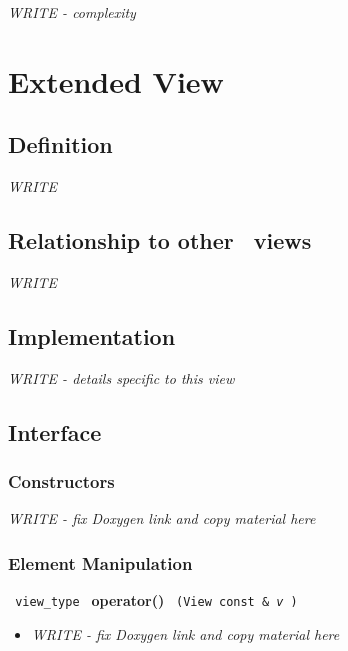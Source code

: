 \emph{WRITE - complexity}


\section{Extended View} \label{sec-extend-vw}

\subsection{Definition}

\textit{WRITE}

\subsection{Relationship to other \stapl\ views}

\textit{WRITE}

\subsection{Implementation}

\textit{WRITE - details specific to this view}

\subsection{Interface} \label{sec-ext-vw-inter}

\subsubsection{Constructors}

\textit{WRITE - fix Doxygen link and copy material here}

\subsubsection{ Element Manipulation}

\noindent
\texttt{%
view\_type
}
\newline
\textbf{operator()}%
\texttt{%
(View const \&
\textit{v}%
)
}

\begin{itemize}
\item
\textit{WRITE - fix Doxygen link and copy material here}
\end{itemize}

